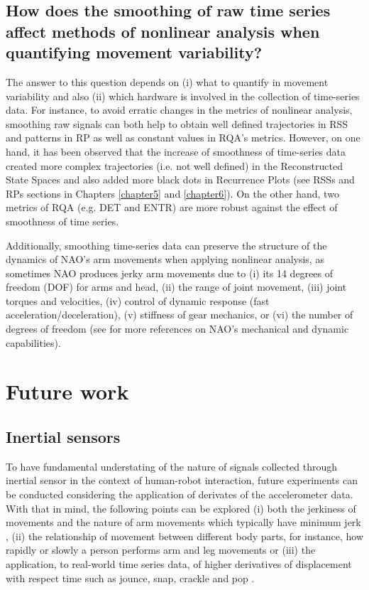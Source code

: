 \subsection*{How does the smoothing of raw time series affect 
	methods of nonlinear analysis when 
	quantifying movement variability?
}
The answer to this question depends on 
(i) what to quantify in movement variability and also 
(ii) which hardware is involved in the collection of 
time-series data. 
For instance, to avoid erratic changes in the metrics
of nonlinear analysis, smoothing raw signals can both help
to obtain well defined trajectories in RSS and patterns in RP
as well as constant values in RQA's metrics.
However, on one hand, it has been observed that the 
increase of smoothness of time-series data created 
more complex trajectories (i.e. not well defined) 
in the Reconstructed State Spaces and also added 
more black dots in Recurrence Plots 
(see RSSs and RPs sections in Chapters \ref{chapter5} and \ref{chapter6}).
On the other hand, two metrics of RQA 
(e.g. DET and ENTR) are more robust against the 
effect of smoothness of time series.

Additionally, smoothing time-series data can preserve 
the structure of the dynamics of NAO's arm movements 
when applying nonlinear analysis, as sometimes NAO 
produces jerky arm movements due to 
(i) its 14 degrees of freedom (DOF) for arms and head,
(ii) the range of joint movement, 
(iii) joint torques and velocities, 
(iv) control of dynamic response (fast acceleration/deceleration), 
(v) stiffness of gear mechanics, or
(vi) the number of degrees of freedom
(see \cite{gouaillier2009} for more references
on NAO's mechanical and dynamic capabilities).

\section{Future work}

\subsection*{Inertial sensors}
To have fundamental understating of the nature of signals collected 
through inertial sensor in the context of human-robot interaction,
future experiments can be conducted considering the application of 
derivates of the accelerometer data. 
With that in mind, the following points can be explored 
(i) both the jerkiness of movements and the 
nature of arm movements which typically have minimum 
jerk \citep{flash1985},
(ii) the relationship of movement between different body parts, 
for instance, how rapidly or slowly a person performs arm and leg 
movements \citep{devries1982, mori2012} or (iii) 
the application, to real-world time series data, of higher derivatives 
of displacement with respect time such as jounce, snap, 
crackle and pop \citep{eager2016}.

